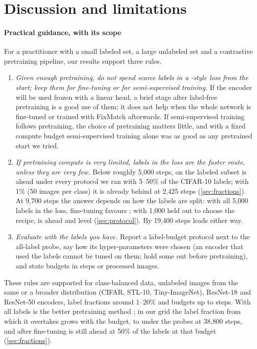 \section{Discussion and limitations}
\label{sec:discussion}

\paragraph{Practical guidance, with its scope}
For a practitioner with a small labeled set, a large unlabeled set and a contrastive pretraining pipeline,
our results support three rules.
\begin{enumerate}[leftmargin=1.6em]
\item \emph{Given enough pretraining, do not spend scarce labels in a \supcon-style loss from the start; keep
them for fine-tuning or for semi-supervised training.} If the encoder will be used frozen with a linear head, a brief \supcon stage
after label-free pretraining is a good use of them; it does not help when the whole network is fine-tuned
or trained with FixMatch afterwards. If semi-supervised training follows pretraining, the choice of
pretraining matters little, and with a fixed compute budget semi-supervised training alone was as good as
any pretrained start we tried.
\item \emph{If pretraining compute is very limited, labels in the loss are the faster route, unless they are very
few.} Below roughly 5,000 steps, \supcon on the labeled subset is ahead under every protocol we ran with 5--50\%
of the CIFAR-10 labels; with 1\% (50 images per class) it is already behind at 2,425 steps
(\cref{sec:fractions}). At 9,700 steps the answer depends on how the labels are split: with all 5,000 labels in
the loss, fine-tuning favours \simclr; with 1,000 held out to choose the recipe, \supcon is
\pt ahead and \union level (\cref{sec:protocol}). By 19,400 steps
\simclr leads either way.
\item \emph{Evaluate with the labels you have.} Report a label-budget protocol next to the all-label probe,
say how its hyper-parameters were chosen (an encoder that used the labels cannot be tuned on them; hold some
out before pretraining), and state budgets in steps or processed images.
\end{enumerate}
These rules are supported for class-balanced data, unlabeled images from the same or a broader distribution
(CIFAR, STL-10, Tiny-ImageNet), ResNet-18 and ResNet-50 encoders, label fractions around 1--20\% and budgets up to
 steps. With all labels \supcon is the better pretraining method \citep{khosla2020supcon};
in our grid the label fraction from which it overtakes \simclr grows with the budget, to
 under the probes at 38,800 steps, and after fine-tuning \simclr is still ahead at
50\% of the labels at that budget (\cref{sec:fractions}).

